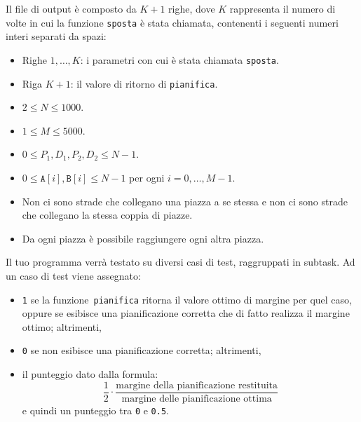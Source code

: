Il file di output è composto da $K+1$ righe,
dove $K$ rappresenta il numero di volte in cui la funzione \texttt{sposta} è stata chiamata,
contenenti i seguenti numeri interi separati da spazi:
\begin{itemize}[nolistsep,itemsep=2mm]
\item Righe $1, \ldots, K$: i parametri con cui è stata chiamata \texttt{sposta}.
\item Riga $K+1$: il valore di ritorno di \texttt{pianifica}.
\end{itemize}



\Constraints

\begin{itemize}[nolistsep, itemsep=2mm]
	\item $2 \le N \le 1000$.
	\item $1 \le M \le 5000$.
	\item $0 \le P_1, D_1, P_2, D_2 \le N-1$.
	\item $0 \le \texttt{A}[i], \texttt{B}[i] \le N-1$ per ogni $i=0, \ldots, M-1$.
	\item Non ci sono strade che collegano una piazza a se stessa e non ci sono strade che collegano la stessa coppia di piazze.
	\item Da ogni piazza è possibile raggiungere ogni altra piazza.
\end{itemize}



\Scoring

Il tuo programma verrà testato su diversi casi di test, raggruppati in subtask.
Ad un caso di test viene assegnato:
\begin{itemize}
\item \texttt{1} se la funzione~\texttt{pianifica} ritorna il valore ottimo di margine per quel caso, oppure se esibisce una pianificazione corretta che di fatto realizza il margine ottimo; altrimenti,
\item \texttt{0} se non esibisce una pianificazione corretta; altrimenti,
\item il punteggio dato dalla formula:
        \[
          \dfrac{\text{1}}{2} \cdot
          \dfrac{\text{margine della pianificazione restituita}}{\text{margine delle pianificazione ottima}}
        \]
        e quindi un punteggio tra \texttt{0} e \texttt{0.5}.
\end{itemize}

